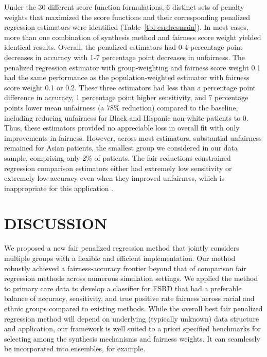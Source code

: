 \documentclass[
  12pt]{article}
\begin{document}
Under the 30 different score function formulations, 6 distinct sets of
penalty weights that maximized the score functions and their
corresponding penalized regression estimators were identified
(Table~\ref{tbl-esrdresmain}). In most cases, more than one combination
of synthesis method and fairness score weight yielded identical results.
Overall, the penalized estimators had 0-4 percentage point decreases in
accuracy with 1-7 percentage point decreases in unfairness. The
penalized regression estimator with group-weighting and fairness score
weight 0.1 had the same performance as the population-weighted estimator
with fairness score weight 0.1 or 0.2. These three estimators had less
than a percentage point difference in accuracy, 1 percentage point
higher sensitivity, and 7 percentage points lower mean unfairness (a
78\% reduction) compared to the baseline, including reducing unfairness
for Black and Hispanic non-white patients to 0. Thus, these estimators
provided no appreciable loss in overall fit with only improvements in
fairness. However, across most estimators, substantial unfairness
remained for Asian patients, the smallest group we considered in our
data sample, comprising only 2\% of patients. The fair reductions
constrained regression comparison estimators either had extremely low
sensitivity or extremely low accuracy even when they improved
unfairness, which is inappropriate for this application
\citep{tisdale_cost-effectiveness_2022}.

\section{DISCUSSION}\label{sec-discussion}

We proposed a new fair penalized regression method that jointly
considers multiple groups with a flexible and efficient implementation.
Our method robustly achieved a fairness-accuracy frontier beyond that of
comparison fair regression methods across numerous simulation settings.
We applied the method to primary care data to develop a classifier for
ESRD that had a preferable balance of accuracy, sensitivity, and true
positive rate fairness across racial and ethnic groups compared to
existing methods. While the overall best fair penalized regression
method will depend on underlying (typically unknown) data structure and
application, our framework is well suited to a priori specified
benchmarks for selecting among the synthesis mechanisms and fairness
weights. It can seamlessly be incorporated into ensembles, for example.
\end{document}

